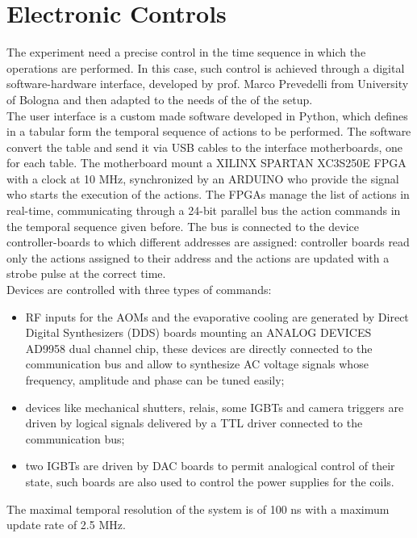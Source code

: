 \documentclass[../thesis.tex]{subfiles}
\begin{document}
\section{Electronic Controls}

The experiment need a precise control in the time sequence in which the operations are performed. In this case, such control is achieved through a digital software-hardware interface, developed by prof. Marco Prevedelli from University of Bologna and then adapted to the needs of the of the setup.\\
The user interface is a custom made software developed in Python, which defines in a tabular form the temporal sequence of actions to be performed. The software convert the table and send it via USB cables to the interface motherboards, one for each table. The motherboard mount a XILINX SPARTAN XC3S250E FPGA with a clock at 10 MHz, synchronized by an ARDUINO who provide the signal who starts the execution of the actions. The FPGAs manage the list of actions in real-time, communicating through a 24-bit parallel bus the action commands in the temporal sequence given before. The bus is connected to the device controller-boards to which different addresses are assigned: controller boards read only the actions assigned to their address and the actions are updated with a strobe pulse at the correct time.\\
Devices are controlled with three types of commands:

\begin{itemize}
\item RF inputs for the AOMs and the evaporative cooling are generated by Direct Digital Synthesizers (DDS) boards mounting an ANALOG DEVICES AD9958 dual channel chip, these devices are directly connected to the communication bus and allow to synthesize AC voltage signals whose frequency, amplitude and phase can be tuned easily;
\item devices like mechanical shutters, relais, some IGBTs and camera triggers are driven by logical signals delivered by a TTL driver connected to the communication bus;
\item two IGBTs are driven by DAC boards to permit analogical control of their state, such boards are also used to control the power supplies for the coils.
\end{itemize}

The maximal temporal resolution of the system is of 100 ns with a maximum update rate of 2.5 MHz.
\end{document}
